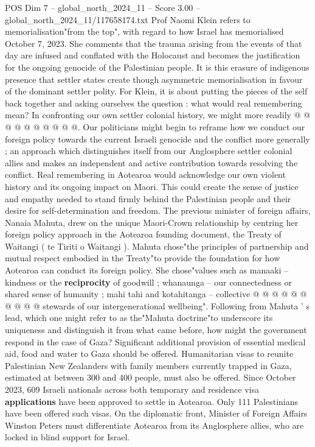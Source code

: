 \begin{textsample}{POS Dim 7 – global\_north\_2024\_11 – Score 3.00 – global\_north\_2024\_11/117658174.txt}
Prof Naomi Klein refers to memorialisation"from the top", with regard to how Israel has memorialised October 7, 2023.
She comments that the trauma arising from the events of that day are infused and conflated with the Holocaust and becomes the justification for the ongoing genocide of the Palestinian people.
It is this erasure of indigenous presence that settler states create though asymmetric memorialisation in favour of the dominant settler polity.
For Klein, it is about putting the pieces of the self back together and asking ourselves the question : what would real remembering mean?
In confronting our own settler colonial history, we might more readily @ @ @ @ @ @ @ @ @ @.
Our politicians might begin to reframe how we conduct our foreign policy towards the current Israeli genocide and the conflict more generally ; an approach which distinguishes itself from our Anglosphere settler colonial allies and makes an independent and active contribution towards resolving the conflict.
Real remembering in Aotearoa would acknowledge our own violent history and its ongoing impact on Maori.
This could create the sense of justice and empathy needed to stand firmly behind the Palestinian people and their desire for self-determination and freedom.
The previous minister of foreign affairs, Nanaia Mahuta, drew on the unique Maori-Crown relationship by centring her foreign policy approach in the Aotearoa founding document, the Treaty of Waitangi ( te Tiriti o Waitangi ).
Mahuta chose"the principles of partnership and mutual respect embodied in the Treaty"to provide the foundation for how Aotearoa can conduct its foreign policy.
She chose"values such as manaaki -- kindness or the \textbf{reciprocity} of goodwill ; whanaunga -- our connectedness or shared sense of humanity ; mahi tahi and kotahitanga -- collective @ @ @ @ @ @ @ @ @ @ stewards of our intergenerational wellbeing".
Following from Mahuta ' s lead, which one might refer to as the"Mahuta doctrine"to underscore its uniqueness and distinguish it from what came before, how might the government respond in the case of Gaza?
Significant additional provision of essential medical aid, food and water to Gaza should be offered.
Humanitarian visas to reunite Palestinian New Zealanders with family members currently trapped in Gaza, estimated at between 300 and 400 people, must also be offered.
Since October 2023, 609 Israeli nationals across both temporary and residence visa \textbf{applications} have been approved to settle in Aotearoa.
Only 111 Palestinians have been offered such visas.
On the diplomatic front, Minister of Foreign Affairs Winston Peters must differentiate Aotearoa from its Anglosphere allies, who are locked in blind support for Israel.

\end{textsample}
